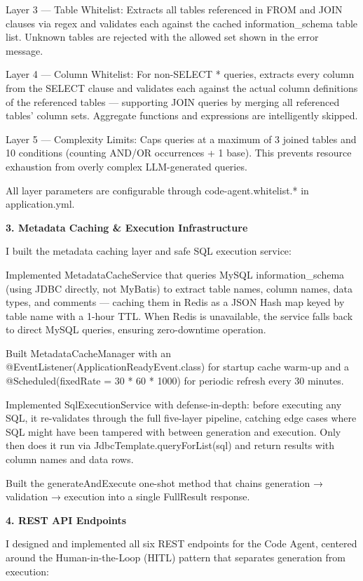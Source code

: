 Layer 3 — Table Whitelist: Extracts all tables referenced in FROM and JOIN clauses via regex and validates each against the cached information\_schema table list. Unknown tables are rejected with the allowed set shown in the error message.

Layer 4 — Column Whitelist: For non-SELECT * queries, extracts every column from the SELECT clause and validates each against the actual column definitions of the referenced tables — supporting JOIN queries by merging all referenced tables' column sets. Aggregate functions and expressions are intelligently skipped.

Layer 5 — Complexity Limits: Caps queries at a maximum of 3 joined tables and 10 conditions (counting AND/OR occurrences + 1 base). This prevents resource exhaustion from overly complex LLM-generated queries.

All layer parameters are configurable through code-agent.whitelist.* in application.yml.

\textbf{3. Metadata Caching \& Execution Infrastructure}

I built the metadata caching layer and safe SQL execution service:

Implemented MetadataCacheService that queries MySQL information\_schema (using JDBC directly, not MyBatis) to extract table names, column names, data types, and comments — caching them in Redis as a JSON Hash map keyed by table name with a 1-hour TTL. When Redis is unavailable, the service falls back to direct MySQL queries, ensuring zero-downtime operation.

Built MetadataCacheManager with an @EventListener(ApplicationReadyEvent.class) for startup cache warm-up and a @Scheduled(fixedRate = 30 * 60 * 1000) for periodic refresh every 30 minutes.

Implemented SqlExecutionService with defense-in-depth: before executing any SQL, it re-validates through the full five-layer pipeline, catching edge cases where SQL might have been tampered with between generation and execution. Only then does it run via JdbcTemplate.queryForList(sql) and return results with column names and data rows.

Built the generateAndExecute one-shot method that chains generation → validation → execution into a single FullResult response.

\textbf{4. REST API Endpoints}

I designed and implemented all six REST endpoints for the Code Agent, centered around the Human-in-the-Loop (HITL) pattern that separates generation from execution:

